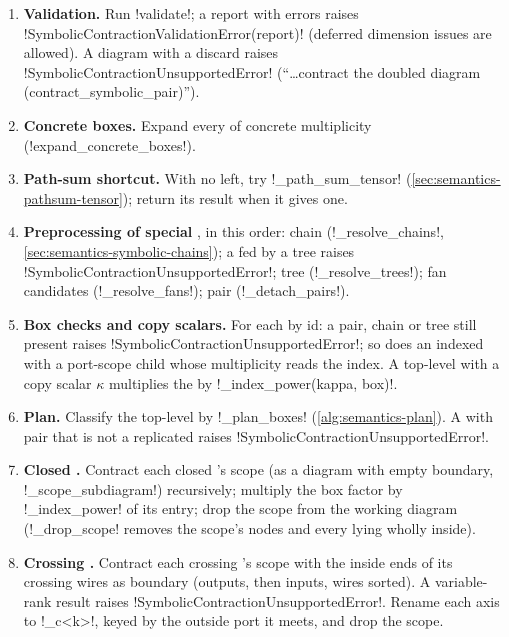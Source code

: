 \begin{algorithm}\label{alg:semantics-contract-symbolic}
\begin{enumerate}
\item \textbf{Validation.} Run \py!validate!; a report with errors raises \py!SymbolicContractionValidationError(report)! (deferred dimension issues are allowed). A diagram with a discard raises \py!SymbolicContractionUnsupportedError! (``\ldots contract the doubled diagram (contract\_symbolic\_pair)'').
\item \textbf{Concrete boxes.} Expand every \bbox{} of concrete multiplicity (\py!expand_concrete_boxes!).
\item \textbf{Path-sum shortcut.} With no \bbox{} left, try \py!_path_sum_tensor! (\cref{sec:semantics-pathsum-tensor}); return its result when it gives one.
\item \textbf{Preprocessing of special \bboxes{}}, in this order: chain \bboxes{} (\py!_resolve_chains!, \cref{sec:semantics-symbolic-chains}); a \bbox{} fed by a tree raises \py!SymbolicContractionUnsupportedError!; tree \bboxes{} (\py!_resolve_trees!); fan candidates (\py!_resolve_fans!); pair \bboxes{} (\py!_detach_pairs!).
\item \textbf{Box checks and copy scalars.} For each \bbox{} by id: a pair, chain or tree \bbox{} still present raises \py!SymbolicContractionUnsupportedError!; so does an indexed \bbox{} with a port-scope child whose multiplicity reads the index. A top-level \bbox{} with a copy scalar $\kappa$ multiplies the  by \py!_index_power(kappa, box)!.
\item \textbf{Plan.} Classify the top-level \bboxes{} by \py!_plan_boxes! (\cref{alg:semantics-plan}). A \bbox{} with pair \bboxes{} that is not a replicated \bbox{} raises \py!SymbolicContractionUnsupportedError!.
\item \textbf{Closed \bboxes{}.} Contract each closed \bbox{}'s scope (as a diagram with empty boundary, \py!_scope_subdiagram!) recursively; multiply the box factor by \py!_index_power! of its entry; drop the scope from the working diagram (\py!_drop_scope! removes the scope's nodes and every \bbox{} lying wholly inside).
\item \textbf{Crossing \bboxes{}.} Contract each crossing \bbox{}'s scope with the inside ends of its crossing wires as boundary (outputs, then inputs, wires sorted). A variable-rank result raises \py!SymbolicContractionUnsupportedError!. Rename each axis to \code!_c<k>!, keyed by the outside port it meets, and drop the scope.

\end{enumerate}
\end{algorithm}
